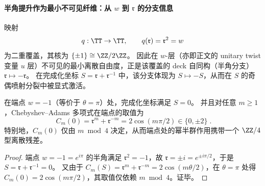 \paragraph{半角提升作为最小不可见纤维：从 \(w\) 到 \(\mathfrak{r}\) 的分支信息}
映射
\[
q:\TT\to\TT,\qquad q(\mathfrak{r})=\mathfrak{r}^{2}=w
\]
为二重覆盖，其核为 \(\{\pm 1\}\cong \ZZ/2\ZZ\)。
因此在 \(w\)-层（亦即正文的 unitary twist 变量 \(u\) 层）不可见的最小离散自由度，正是该覆盖的 deck 自同构（半角分支）\(\mathfrak{r}\mapsto-\mathfrak{r}\)。
在完成化坐标 \(S=\mathfrak{r}+\mathfrak{r}^{-1}\) 中，该分支体现为
\(
S\mapsto -S
\)，从而在 \(S\) 的奇偶喷射分裂中被显式激活。

\begin{proposition}[端点 \texorpdfstring{$w=-1$}{w=-1} 的半角残差与 \texorpdfstring{$\ZZ/4$}{Z/4} 型取值]\label{prop:half-angle-z4-residue}
在端点 \(w=-1\)（等价于 \(\theta=\pi\)）处，完成化坐标满足 \(S=0\)。
并且对任意 \(m\ge 1\)，Chebyshev--Adams 多项式在端点的取值为
\begin{equation}\label{eq:chebyshev-endpoint-values}
\boxed{\;
C_m(0)=\mathfrak{r}^{m}+\mathfrak{r}^{-m}=2\cos(m\pi/2)\in\{0,\pm 2\}\; }.
\end{equation}
特别地，\(C_m(0)\) 仅由 \(m\bmod 4\) 决定，从而端点处的幂半群作用携带一个 \(\ZZ/4\) 型离散残差。
\end{proposition}
\begin{proof}
端点 \(w=-1=e^{i\pi}\) 的半角满足 \(\mathfrak{r}^{2}=-1\)，故 \(\mathfrak{r}=\pm i=e^{\pm i\pi/2}\)，于是 \(S=\mathfrak{r}+\mathfrak{r}^{-1}=0\)。
又由于 \(C_m(S)=\mathfrak{r}^m+\mathfrak{r}^{-m}=2\cos(m\theta/2)\)，在 \(\theta=\pi\) 处得
\(
C_m(0)=2\cos(m\pi/2)
\)，其取值仅依赖 \(m\bmod 4\)。证毕。
\end{proof}

